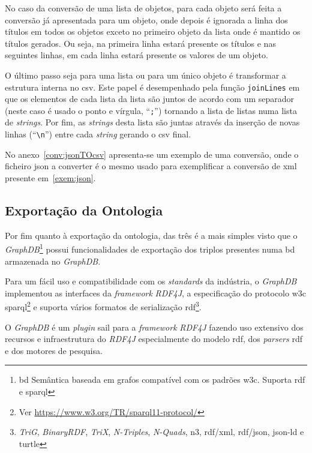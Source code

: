 No caso da conversão de uma lista de objetos, para cada objeto será feita a conversão já apresentada para um objeto, onde depois é ignorada a linha dos títulos em todos os objetos exceto no primeiro objeto da lista onde é mantido os títulos gerados. Ou seja, na primeira linha estará presente os títulos e nas seguintes linhas, em cada linha estará presente os valores de um objeto.

O último passo seja para uma lista ou para um único objeto é transformar a estrutura interna no \acrshort{csv}. Este papel é desempenhado pela função \texttt{joinLines} em que os elementos de cada lista da lista são juntos de acordo com um separador (neste caso é usado o ponto e vírgula, ``\texttt{;}'') tornando a lista de listas numa lista de \textit{strings}. Por fim, as \textit{strings} desta lista são juntas através da inserção de novas linhas (``\texttt{\textbackslash{}n}'') entre cada \textit{string} gerando o \acrshort{csv} final.

No anexo~\ref{conv:jsonTOcsv} apresenta-se um exemplo de uma conversão, onde o ficheiro \acrshort{json} a converter é o mesmo usado para exemplificar a conversão de \acrshort{xml} presente em~\ref{exem:json}.

\subsection{Exportação da Ontologia}
Por fim quanto à exportação da ontologia, das três é a mais simples visto que o \textit{GraphDB}\footnote{\acrfull{bd} Semântica baseada em grafos compatível com os padrões \acrshort{w3c}. Suporta \acrshort{rdf} e \acrshort{sparql}} possui funcionalidades de exportação dos triplos presentes numa \acrshort{bd} armazenada no \textit{GraphDB}.

Para um fácil uso e compatibilidade com os \textit{standards} da indústria, o \textit{GraphDB} implementou as interfaces da \textit{framework} \textit{RDF4J}, a especificação do protocolo \acrshort{w3c} \acrshort{sparql}\footnote{Ver \url{https://www.w3.org/TR/sparql11-protocol/}} e suporta vários formatos de serialização \acrshort{rdf}\footnote{\label{fnRDF}\textit{TriG}, \textit{BinaryRDF}, \textit{TriX}, \textit{N-Triples}, \textit{N-Quads}, \acrshort{n3}, \acrshort{rdf}/\acrshort{xml}, \acrshort{rdf}/\acrshort{json}, \acrshort{json-ld} e \acrshort{turtle}}.~\cite{graphdbAbout}

O \textit{GraphDB} é um \textit{plugin} \acrshort{sail} para a \textit{framework} \textit{RDF4J} fazendo uso extensivo dos recursos e infraestrutura do \textit{RDF4J} especialmente do modelo \acrshort{rdf}, dos \textit{parsers} \acrshort{rdf} e dos motores de pesquisa.~\cite{graphdbArch}

